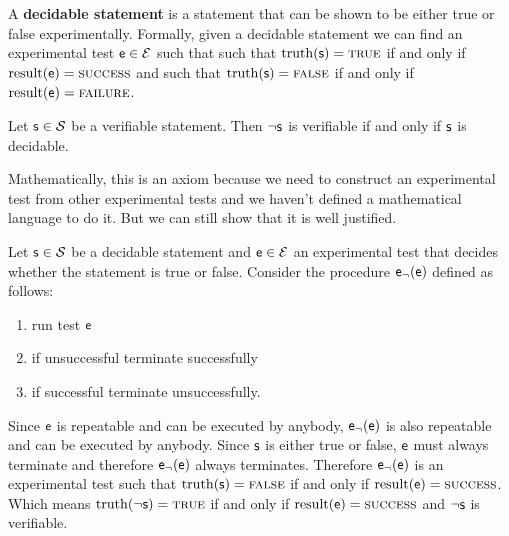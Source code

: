 \documentclass[11pt,letterpaper,fleqn]{memoir} %
\begin{document}
\begin{mathSection}
	\begin{defn}
		A \textbf{decidable statement} is a statement that can be shown to be either true or false experimentally. Formally, given a decidable statement we can find an experimental test $\mathsf{e} \in \mathcal{E}$ such that such that $\operatorname{truth}(\mathsf{s})=\textsc{true}$ if and only if $\operatorname{result}(\mathsf{e})=\textsc{success}$ and such that $\operatorname{truth}(\mathsf{s})=\textsc{false}$ if and only if $\operatorname{result}(\mathsf{e})=\textsc{failure}$.
	\end{defn}
	\begin{axiom}
		Let $\mathsf{s} \in \mathcal{S}$ be a verifiable statement. Then $\neg\mathsf{s}$ is verifiable if and only if $\mathsf{s}$ is decidable.
	\end{axiom}
	\begin{justification}
		Mathematically, this is an axiom because we need to construct an experimental test from other experimental tests and we haven't defined a mathematical language to do it. But we can still show that it is well justified.
		
		Let $\mathsf{s} \in \mathcal{S}$ be a decidable statement and $\mathsf{e} \in \mathcal{E}$ an experimental test that decides whether the statement is true or false. Consider the procedure $\mathsf{e}_\neg(\mathsf{e})$ defined as follows:
		\begin{enumerate}
			\item run test $\mathsf{e}$
			\item if unsuccessful terminate successfully
			\item if successful terminate unsuccessfully.
		\end{enumerate}
		Since $\mathsf{e}$ is repeatable and can be executed by anybody, $\mathsf{e}_\neg(\mathsf{e})$ is also repeatable and can be executed by anybody. Since $\mathsf{s}$ is either true or false, $\mathsf{e}$ must always terminate and therefore $\mathsf{e}_\neg(\mathsf{e})$ always terminates.  Therefore $\mathsf{e}_\neg(\mathsf{e})$ is an experimental test such that $\operatorname{truth}(\mathsf{s})=\textsc{false}$ if and only if $\operatorname{result}(\mathsf{e})=\textsc{success}$. Which means $\operatorname{truth}(\neg\mathsf{s})=\textsc{true}$ if and only if $\operatorname{result}(\mathsf{e})=\textsc{success}$ and $\neg\mathsf{s}$ is verifiable.
		

\end{justification}
\end{mathSection}
\end{document}
